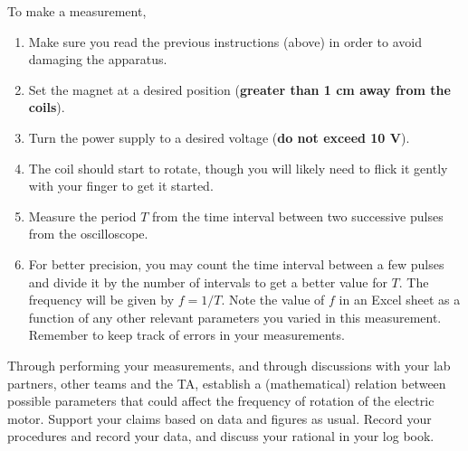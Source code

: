 \documentclass[12pt]{report}
\begin{document}
To make a measurement,
\begin{enumerate}
\item Make sure you read the previous instructions (above) in order to avoid damaging the apparatus.
\item Set the magnet at a desired position (\textbf{greater than 1 cm away from the coils}).
\item Turn the power supply to a desired voltage (\textbf{do not exceed 10 V}).
\item The coil should start to rotate, though you will likely need to flick it gently with your finger to get it started.
\item Measure the period $T$ from the time interval between two successive pulses from the oscilloscope.
\item For better precision, you may count the time interval between a few pulses and divide it by the number of intervals to get a better value for $T$. The frequency will be given by $f = 1/T$. Note the value of $f$ in an Excel sheet as a function of any other relevant parameters you varied in  this measurement. Remember to keep track of errors in your measurements.
\end{enumerate}

{\color{blue} Through performing your measurements, and through discussions with your lab partners, other teams and the TA, establish a (mathematical) relation between possible parameters that could affect the frequency of rotation of the electric motor. 
Support your claims based on data and figures as usual. Record your procedures and record your data, and discuss your rational in your log book.}
\end{document}

